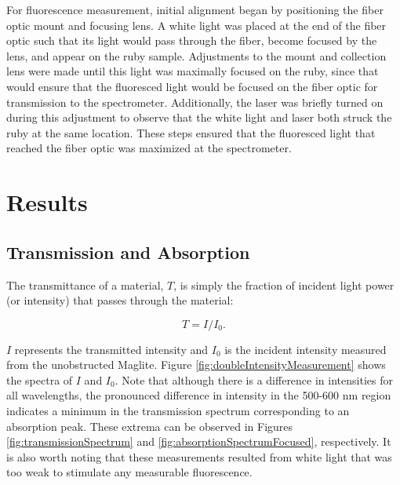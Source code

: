 \documentclass[11pt, a4paper, twocolumn]{article}
\begin{document}
For fluorescence measurement, initial alignment began by positioning the fiber optic mount and focusing lens. A white light was placed at the end of the fiber optic such that its light would pass through the fiber, become focused by the lens, and appear on the ruby sample. Adjustments to the mount and collection lens were made until this light was maximally focused on the ruby, since that would ensure that the fluoresced light would be focused on the fiber optic for transmission to the spectrometer. Additionally, the laser was briefly turned on during this adjustment to observe that the white light and laser both struck the ruby at the same location. These steps ensured that the fluoresced light that reached the fiber optic was maximized at the spectrometer.

\section*{Results}
\subsection*{Transmission and Absorption}

The transmittance of a material, $T$, is simply the fraction of incident light power (or intensity) that passes through the material:
\setlength{\abovedisplayskip}{8pt}
\setlength{\belowdisplayskip}{8pt}

\begin{equation}\label{eq1}
    T=I/I_0. 
\end{equation}

$I$ represents the transmitted intensity and $I_0$ is the incident intensity measured from the unobstructed Maglite. Figure \ref{fig:doubleIntensityMeasurement} shows the spectra of $I$ and $I_0$. Note that although there is a difference in intensities for all wavelengths, the pronounced difference in intensity in the 500-600 nm region indicates a minimum in the transmission spectrum corresponding to an absorption peak. These extrema can be observed in Figures \ref{fig:transmissionSpectrum} and \ref{fig:absorptionSpectrumFocused},  respectively. It is also worth noting that these measurements resulted from white light that was too weak to stimulate any measurable fluorescence.
\end{document}

